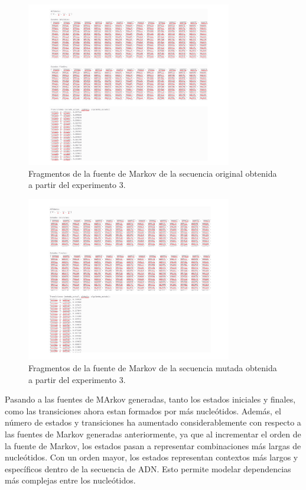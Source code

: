 \documentclass[11pt,spanish,listoffigures,listoftables]{tfgetsinf}
\begin{document}
\begin{figure}[H]
      \centering
      \includegraphics[width=0.8\textwidth]{aut1_exp4.png}
      \caption{Fragmentos de la fuente de Markov de la secuencia original obtenida a partir del experimento 3.}
      \label{fig:etiqueta_opcional43}
\end{figure}

\begin{figure}[H]
      \centering
      \includegraphics[width=0.8\textwidth]{aut2_exp4.png}
      \caption{Fragmentos de la fuente de Markov de la secuencia mutada obtenida a partir del experimento 3.}
      \label{fig:etiqueta_opcional44}
\end{figure}

Pasando a las fuentes de MArkov generadas, tanto los estados iniciales y finales, como las transiciones ahora estan formados por más nucleótidos. Además, el número de estados y transiciones ha aumentado considerablemente con respecto a las fuentes de Markov generadas anteriormente, ya que al incrementar el orden de la fuente de Markov, los estados pasan a representar combinaciones más largas de nucleótidos. Con un orden mayor, los estados representan contextos más largos y específicos dentro de la secuencia de \acs{ADN}. Esto permite modelar dependencias más complejas entre los nucleótidos.
\end{document}
